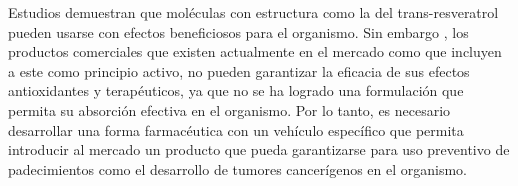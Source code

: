 Estudios demuestran que moléculas con estructura como la del trans-resveratrol pueden usarse
con efectos beneficiosos para el organismo. Sin embargo , los productos comerciales que existen actualmente en el mercado
 como que incluyen a este como principio activo, no pueden garantizar
 la eficacia de sus efectos antioxidantes y terapéuticos, ya que no se ha
 logrado una formulación que permita su absorción efectiva en el organismo.
Por lo tanto, es necesario desarrollar una forma farmacéutica con un vehículo específico que permita introducir
al mercado un producto que pueda garantizarse para uso preventivo de padecimientos
como el desarrollo de tumores cancerígenos en el organismo.